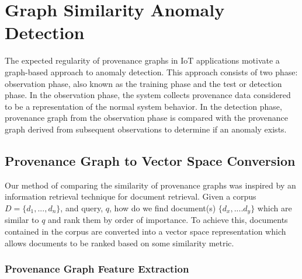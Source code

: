 

\section{Graph Similarity Anomaly Detection}

The expected regularity of provenance graphs in IoT applications motivate a graph-based approach to anomaly detection. This approach consists of two phase: observation phase, also known as the training phase and the test or detection phase. In the observation phase, the system collects provenance data considered to be a representation of the normal system behavior. In the detection phase,  provenance graph from the observation phase is compared with the provenance graph derived from subsequent observations to determine if an anomaly exists. 


\subsection{Provenance Graph to Vector Space Conversion }

Our method of comparing the similarity of provenance graphs was inspired by an information retrieval technique for document retrieval. Given a corpus $D = \{ d_1,..., d_n\}$, and query, $q$, how do we find document(s) $\{d_x,....d_y\}$ which are similar to $q$ and rank them by order of importance. To achieve this, documents contained in the corpus are converted into a vector space representation which allows documents to be ranked based on some similarity metric. 





\subsubsection{Provenance Graph Feature Extraction}

